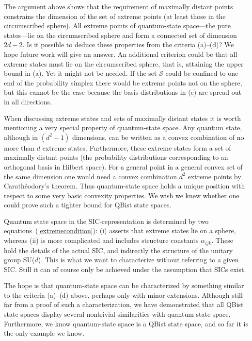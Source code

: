 \documentclass[letterpaper,11pt]{article}
\begin{document}
The argument above shows that the requirement of maximally distant points constrains the dimension of the set of extreme points (at least those in the circumscribed sphere). All extreme points of quantum-state space---the pure states---lie on the circumscribed sphere and form a connected set of dimension $2d-2$. Is it possible to deduce these properties from the criteria (a)--(d)? We hope future work will give an answer. An additional criterion could be that all extreme states must lie on the circumscribed sphere, that is, attaining the upper bound in (a). Yet it might not be needed. If the set $\mathcal S$ could be confined to one end of the probability simplex there would be extreme points not on the sphere, but this cannot be the case because the basis distributions in (c) are spread out in all directions.

When discussing extreme states and sets of maximally distant states it is worth mentioning a very special property of quantum-state space. Any quantum state, although in $(d^2-1)$ dimensions, can be written as a convex combination of no more than $d$ extreme states. Furthermore, these extreme states form a set of maximally distant points (the probability distributions corresponding to an orthogonal basis in Hilbert space). For a general point in a general convex set of the same dimension one would need a convex combination $d^2$ extreme points by Carath\'eodory's theorem.  Thus quantum-state space holds a unique position with respect to some very basic convexity properties.  We wish we knew whether one could prove such a tighter bound for QBist state spaces.

Quantum state space in the SIC-representation is determined by two equations~(\ref{extremecondition}): (i) asserts that extreme states lie on a sphere, whereas (ii) is more complicated and includes structure constants $\alpha_{ijk}$. These hold the details of the actual SIC, and indirectly the structure of the unitary group SU($d$). This is what we want to characterize without referring to a given SIC. Still it can of course only be achieved under the assumption that SICs exist.

The hope is that quantum-state space can be characterized by something similar to the criteria (a)--(d) above, perhaps only with minor extensions. Although still far from a proof of such a characterization, we have demonstrated that all QBist state spaces display several nontrivial similarities with quantum-state space. Furthermore, we know quantum-state space is a QBist state space, and so far it is the only example we know.
\end{document}
